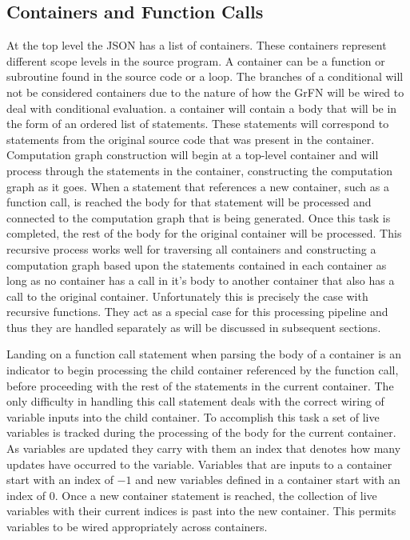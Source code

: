 \subsection{Containers and Function Calls\label{sec:containers}}
At the top level the JSON has a list of containers. These containers represent different scope levels in the source program. A container can be a function or subroutine found in the source code or a loop. The branches of a conditional will not be considered containers due to the nature of how the GrFN will be wired to deal with conditional evaluation. a container will contain a body that will be in the form of an ordered list of statements. These statements will correspond to statements from the original source code that was present in the container. Computation graph construction will begin at a top-level container and will process through the statements in the container, constructing the computation graph as it goes. When a statement that references a new container, such as a function call, is reached the body for that statement will be processed and connected to the computation graph that is being generated. Once this task is completed, the rest of the body for the original container will be processed. This recursive process works well for traversing all containers and constructing a computation graph based upon the statements contained in each container as long as no container has a call in it's body to another container that also has a call to the original container. Unfortunately this is precisely the case with recursive functions. They act as a special case for this processing pipeline and thus they are handled separately as will be discussed in subsequent sections.

Landing on a function call statement when parsing the body of a container is an indicator to begin processing the child container referenced by the function call, before proceeding with the rest of the statements in the current container.
The only difficulty in handling this call statement deals with the correct wiring of variable inputs into the child container.
To accomplish this task a set of live variables is tracked during the processing of the body for the current container.
As variables are updated they carry with them an index that denotes how many updates have occurred to the variable.
Variables that are inputs to a container start with an index of $-1$ and new variables defined in a container start with an index of $0$.
Once a new container statement is reached, the collection of live variables with their current indices is past into the new container.
This permits variables to be wired appropriately across containers.

